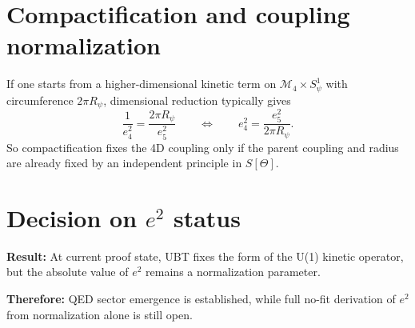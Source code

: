 \documentclass[11pt,a4paper]{article}
\begin{document}
\section{Compactification and coupling normalization}
If one starts from a higher-dimensional kinetic term on
$\mathcal{M}_4\times S^1_\psi$ with circumference $2\pi R_\psi$, dimensional reduction
typically gives
\begin{equation}
\frac{1}{e_4^2}=\frac{2\pi R_\psi}{e_5^2}
\qquad\Longleftrightarrow\qquad
e_4^2=\frac{e_5^2}{2\pi R_\psi}.
\end{equation}
So compactification fixes the 4D coupling only if the parent coupling and radius are
already fixed by an independent principle in $S[\Theta]$.

\section{Decision on \texorpdfstring{$e^2$}{e2} status}
\textbf{Result:} At current proof state, UBT fixes the form of the U(1) kinetic operator,
but the absolute value of $e^2$ remains a normalization parameter.

\textbf{Therefore:} QED sector emergence is established, while full no-fit derivation of
$e^2$ from normalization alone is still open.
\end{document}
